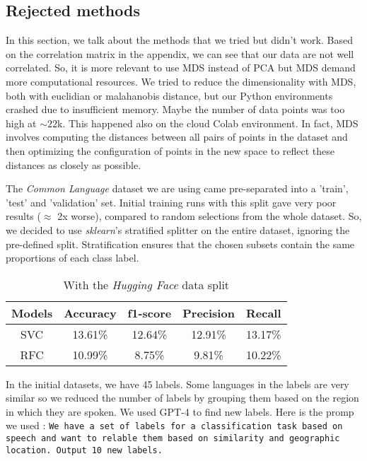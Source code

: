 \documentclass[twocolumn]{article}
\begin{document}
\subsection{Rejected methods}
In this section, we talk about the methods that we tried but didn't work. Based on the correlation matrix in the appendix, we can see that our data are not well correlated. So, it is more relevant to use MDS instead of PCA but MDS demand more computational resources. We tried to reduce the dimensionality with MDS, both with euclidian or malahanobis distance, but our Python environments crashed due to insufficient memory. Maybe the number of data points was too high at $\sim22$k. This happened also on the cloud Colab environment. 
In fact, MDS involves computing the distances between all pairs of points in the dataset and then optimizing the configuration of points in the new space to reflect these distances as closely as possible.

The \textit{Common Language} dataset we are using came pre-separated into a 'train', 'test' and 'validation' set. Initial training runs with this split gave very poor results ($\approx$ 2x worse), compared to random selections from the whole dataset. So, we decided to use \textit{sklearn}'s stratified splitter on the entire dataset, ignoring the pre-defined split. Stratification ensures that the chosen subsets contain the same proportions of each class label.

\begin{table}[h]
    \centering
    \begin{tabular}{|c|c|c|c|c|}
    \hline
      Models & Accuracy & f1-score & Precision & Recall\\  
      \hline
      SVC & 13.61\% & 12.64\% & 12.91\% & 13.17\%\\
        \hline
      RFC & 10.99\% & 8.75\% & 9.81\% & 10.22\% \\
    \hline
    \end{tabular}
    \label{tab:my_label}
    \caption{With the \textit{Hugging Face} data split}
\end{table}

In the initial datasets, we have 45 labels. Some languages in the labels are very similar so we reduced the number of labels by grouping them based on the region in which they are spoken. We used GPT-4 to find new labels. Here is the promp we used : \texttt{We have a set of labels for a classification task based on speech and want to relable them based on similarity and geographic location. Output 10 new labels.}
\end{document}
